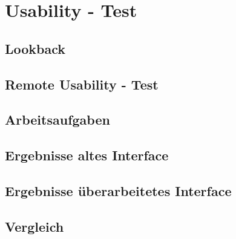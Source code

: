 \chapter{Usability - Test}\label{ch:outlook}

\section{Lookback}
\section{Remote Usability - Test}
\section{Arbeitsaufgaben}
\section{Ergebnisse altes Interface}
\section{Ergebnisse überarbeitetes Interface}
\section{Vergleich}
